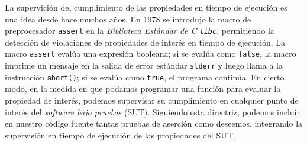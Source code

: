 

La supervición del cumplimiento de las propiedades en tiempo de ejecución es una idea desde hace muchos años.
%
En 1978 se introdujo la macro de preprocesador \texttt{assert} en la \emph{Biblioteca Estándar de C \texttt{libc}}, permitiendo la detección de violaciones de propiedades de interés en tiempo de ejecución. La macro \texttt{assert} evalúa una expresión booleana; si se evalúa como \texttt{false}, la macro imprime un mensaje en la salida de error estándar \texttt{stderr} y luego llama a la instrucción \texttt{abort()}; si se evalúa como \texttt{true}, el programa continúa. En cierto modo, en la medida en que podamos programar una función para evaluar la propiedad de interés, podemos supervisar su cumplimiento en cualquier punto de interés del \emph{software bajo pruebas} (SUT). Siguiendo esta directriz, podemos incluir en nuestro código fuente tantas pruebas de aserción como deseemos, integrando la supervisión en tiempo de ejecución de las propiedades del SUT.



